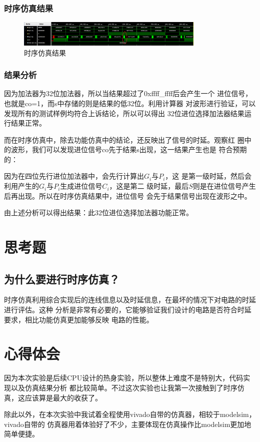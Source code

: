 \documentclass{../source/zjureport}
\begin{document}
            \subsubsection{时序仿真结果}
                \begin{figure}[!htp]
                    \centering
                    \includegraphics[width = 0.8\textwidth]{figure/timingSimulation.png}
                    \caption{时序仿真结果}
                \end{figure}
            \subsubsection{结果分析}
                因为加法器为32位加法器，所以当结果超过了0xffff_ffff后会产生一个
                进位信号，也就是co=1，而s中存储的则是结果的低32位。利用计算器
                对波形进行验证，可以发现所有的测试样例均符合上诉结论，所以可以得出
                32位进位选择加法器结果运行结果正常。

                而在时序仿真中，除去功能仿真中的结论，还反映出了信号的时延。观察红
                圈中的波形，我们可以发现进位信号co先于结果s出现，这一结果产生也是
                符合预期的：
                
                因为在四位先行进位加法器中，会先行计算出$G_i$与$P_i$，这
                是第一级时延，然后会利用产生的$G_i$与$P_i$生成进位信号$C_i$，这是第二
                级时延，最后$S$则是在进位信号产生后再出现。所以在时序仿真结果中，进位信号
                会先于结果信号出现在波形之中。

                由上述分析可以得出结果：此32位进位选择加法器功能正常。

    \section{思考题}
        \subsection{为什么要进行时序仿真？}
        时序仿真利用综合实现后的连线信息以及时延信息，在最坏的情况下对电路的时延进行评估。这种
        分析是非常有必要的，它能够验证我们设计的电路是否符合时延要求，相比功能仿真更加能够反映
        电路的性能。

    \section{心得体会}
        因为本次实验是后续CPU设计的热身实验，所以整体上难度不是特别大，代码实现以及仿真结果分析
        都比较简单。不过这次实验也让我第一次接触到了时序仿真，这应该算是最大的收获了。

        除此以外，在本次实验中我试着全程使用vivado自带的仿真器，相较于modelsim，vivado自带的
        仿真器用着体验好了不少，主要体现在仿真操作比modelsim更加地简单便捷。
\end{document}
